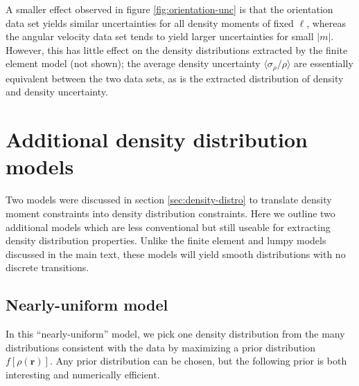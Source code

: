 \documentclass[fleqn,usenatbib]{mnras}
\begin{document}
A smaller effect observed in figure \ref{fig:orientation-unc} is that the orientation data set yields similar uncertainties for all density moments of fixed $\ell$, whereas the angular velocity data set tends to yield larger uncertainties for small $|m|$. However, this has little effect on the density distributions extracted by the finite element model (not shown); the average density uncertainty $\langle \sigma_\rho / \rho \rangle$ are essentially equivalent between the two data sets, as is the extracted distribution of density and density uncertainty.




\section{Additional density distribution models}
\label{app:more-models}

Two models were discussed in section \ref{sec:density-distro} to translate density moment constraints into density distribution constraints. Here we outline two additional models which are less conventional but still useable for extracting density distribution properties. Unlike the finite element and lumpy models discussed in the main text, these models will yield smooth distributions with no discrete transitions.

\subsection{Nearly-uniform model}
In this ``nearly-uniform'' model, we pick one density distribution from the many distributions consistent with the data by maximizing a prior distribution $f[\rho(\bm r)]$. Any prior distribution can be chosen, but the following prior is both interesting and numerically efficient.
\end{document}
